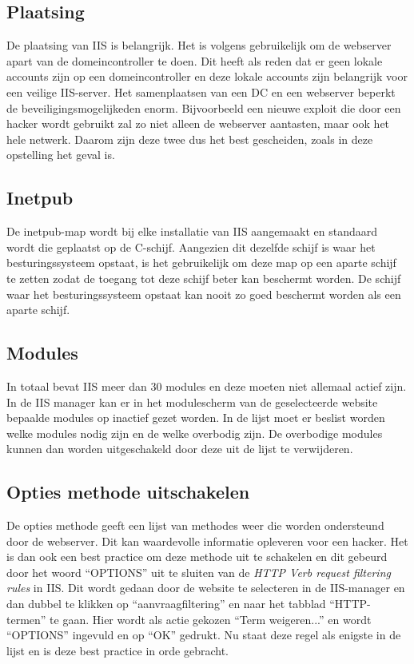\documentclass[pdftex,a4paper,12pt]{report}
\begin{document}
\subsection{Plaatsing}
De plaatsing van IIS is belangrijk. Het is volgens \cite{Microsoft2013} gebruikelijk om de webserver apart van de domeincontroller te doen. Dit heeft als reden dat er geen lokale accounts zijn op een domeincontroller en deze lokale accounts zijn belangrijk voor een veilige IIS-server. Het samenplaatsen van een DC en een webserver beperkt de beveiligingsmogelijkeden enorm. Bijvoorbeeld een nieuwe exploit die door een hacker wordt gebruikt zal zo niet alleen de webserver aantasten, maar ook het hele netwerk. Daarom zijn deze twee dus het best gescheiden, zoals in deze opstelling het geval is.

\subsection{Inetpub}
De inetpub-map wordt bij elke installatie van IIS aangemaakt en standaard wordt die geplaatst op de C-schijf. Aangezien dit dezelfde schijf is waar het besturingssysteem opstaat, is het gebruikelijk om deze map op een aparte schijf te zetten zodat de toegang tot deze schijf beter kan beschermt worden. De schijf waar het besturingssysteem opstaat kan nooit zo goed beschermt worden als een aparte schijf. \citep{Microsoft2013}

\subsection{Modules}
In totaal bevat IIS meer dan 30 modules en deze moeten niet allemaal actief zijn. In de IIS manager kan er in het modulescherm van de geselecteerde website bepaalde modules op inactief gezet worden. In de lijst moet er beslist worden welke modules nodig zijn en de welke overbodig zijn. De overbodige modules kunnen dan worden uitgeschakeld door deze uit de lijst te verwijderen. 

\subsection{Opties methode uitschakelen}
De opties methode geeft een lijst van methodes weer die worden ondersteund door de webserver. Dit kan waardevolle informatie opleveren voor een hacker. Het is dan ook een best practice om deze methode uit te schakelen en dit gebeurd door het woord "`OPTIONS"' uit te sluiten van de \textit{HTTP Verb request filtering rules} in IIS. Dit wordt gedaan door de website te selecteren in de IIS-manager en dan dubbel te klikken op "`aanvraagfiltering"' en naar het tabblad "`HTTP-termen"' te gaan. Hier wordt als actie gekozen "`Term weigeren..."' en wordt "`OPTIONS"' ingevuld en op "`OK"' gedrukt. Nu staat deze regel als enigste in de lijst en is deze best practice in orde gebracht.
\end{document}

